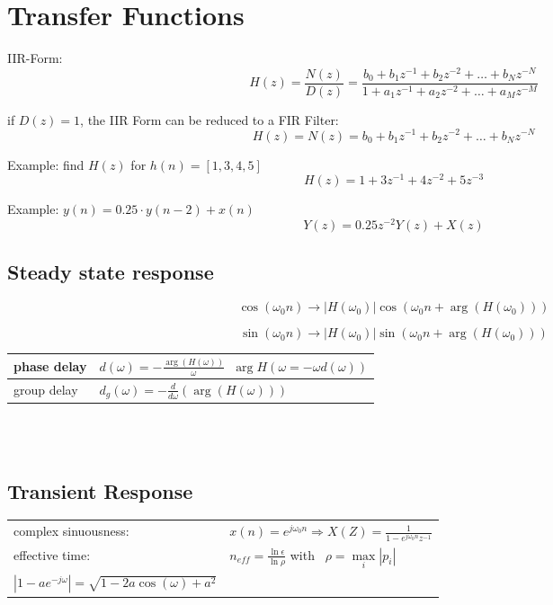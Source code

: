 \section{Transfer Functions}
IIR-Form:
\[ 
	H(z) = \frac{N(z)}{D(z)}
		= \frac{b_0 + b_1 z^{-1} + b_2 z^{-2} + \ldots + b_N z^{-N}}{1 + a_1 z^{-1} + a_2 z^{-2} + \ldots + a_M z^{-M} }
\]

if $D(z) = 1$, the IIR Form can be reduced to a FIR Filter:
\[
	H(z) = N(z) = b_0 + b_1 z^{-1} + b_2 z^{-2} + \ldots + b_N z^{-N}
\]

Example: find $H(z)$ for $h(n) = \left[1,3,4,5\right]$
\[ H(z) = 1 + 3z^{-1} + 4z^{-2} + 5z^{-3}\]

Example: $y(n) = 0.25 \cdot y(n-2) + x(n) $
\[
	Y(z) = 0.25z^{-2}Y(z) + X(z)
\]

\subsection{Steady state response}
\[\cos(\omega_0 n) \rightarrow \left|H(\omega_0) \right| \cos(\omega_0 n + \arg(H(\omega_0))) \]

\[\sin(\omega_0 n) \rightarrow \left|H(\omega_0) \right| \sin(\omega_0 n + \arg(H(\omega_0))) \]

\begin{tabularx}{0.6\textwidth}{|l|X|}
	\hline
	phase delay & $d(\omega) = - \frac{\arg(H(\omega))}{\omega}$\ \qquad $\arg H(\omega = -\omega d(\omega))$
	\\ \hline 
	group delay & $d_g(\omega) = -\frac{d}{d\omega}(\arg(H(\omega)))$	
	\\ \hline
\end{tabularx}\\ \\

\subsection{Transient Response}
\begin{tabularx}{1\textwidth}{l X}
	complex sinuousness: & $x(n) = e^{j \omega_0 n} \Rightarrow X(Z) = \frac{1}{1-e^{j \omega_0 n} z^{-1}} $
	\\ 
	effective time: & $n_{eff} = \frac{\ln \epsilon}{\ln \rho}$ \qquad with \qquad \
	$\rho = \max\limits_{i}\left|p_i \right|$
	\\ 
	$\left| 1-a e^{-j\omega}\right| = \sqrt{1-2a\cos(\omega) + a^2}$
\end{tabularx}\\ \\

